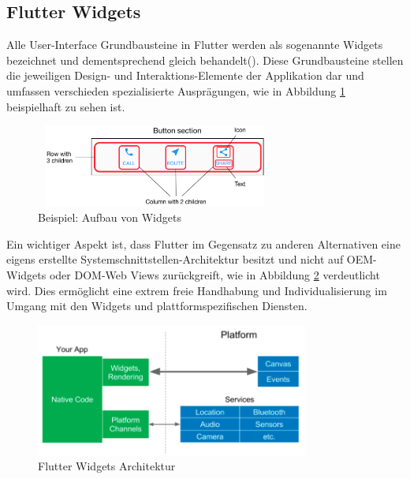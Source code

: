 \documentclass[bibliography=totoc,listof=totoc,BCOR=5mm,DIV=12,oneside]{scrbook}
\begin{document}
\newpage
\subsection{Flutter Widgets}
\par Alle User-Interface Grundbausteine in Flutter werden als sogenannte Widgets bezeichnet und dementsprechend gleich behandelt(\cite{Flu5}). Diese Grundbausteine stellen die jeweiligen Design- und Interaktions-Elemente der Applikation dar und umfassen verschieden spezialisierte Ausprägungen, wie in Abbildung \ref{img:FlutterWidgetButtonSectionExample} beispielhaft zu sehen ist.

\bigskip
\begin{figure}[H]
	\centering
	\includegraphics[width=0.8\textwidth, keepaspectratio]{Bilder/FlutterWidgetButtonSectionExample.png}
	\caption{Beispiel: Aufbau von Widgets  \cite{FlutterBuildingLayouts}}
	\label{img:FlutterWidgetButtonSectionExample}
\end{figure}

\par \medskip Ein wichtiger Aspekt ist, dass Flutter im Gegensatz zu anderen Alternativen eine eigens erstellte Systemschnittstellen-Architektur besitzt und nicht auf OEM-Widgets oder DOM-Web Views zurückgreift\citep{HackernoonFlutterArcticle}, wie in Abbildung \ref{img:hackernoonFlutterArcticleArchitecture} verdeutlicht wird. Dies ermöglicht eine extrem freie Handhabung und Individualisierung im Umgang mit den Widgets und plattformspezifischen Diensten.

\bigskip
\begin{figure}[H]
	\centering
	\includegraphics[width=0.8\textwidth, keepaspectratio]{Bilder/WidgetsFlutterArchitecture.png}
	\caption{Flutter Widgets Architektur \cite{HackernoonFlutterArcticle}}
	\label{img:hackernoonFlutterArcticleArchitecture}
\end{figure}
\end{document}
